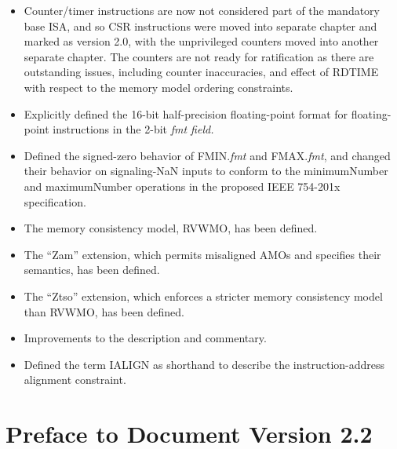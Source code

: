 \begin{itemize}
\item Counter/timer instructions are now not considered part of the
  mandatory base ISA, and so CSR instructions were moved into separate
  chapter and marked as version 2.0, with the unprivileged counters
  moved into another separate chapter.  The counters are not ready for
  ratification as there are outstanding issues, including counter
  inaccuracies, and effect of RDTIME with respect to the memory model
  ordering constraints.
\item Explicitly defined the 16-bit half-precision floating-point
  format for floating-point instructions in the 2-bit {\em fmt field.}
\item Defined the signed-zero behavior of FMIN.{\em fmt} and FMAX.{\em fmt},
  and changed their behavior on signaling-NaN inputs to conform to the
  minimumNumber and maximumNumber operations in the proposed IEEE 754-201x
  specification.
\item The memory consistency model, RVWMO, has been defined.
\item The ``Zam'' extension, which permits misaligned AMOs and specifies their semantics, has been defined.
\item The ``Ztso'' extension, which enforces a stricter memory consistency model than RVWMO, has been defined.
\item Improvements to the description and commentary.
\item Defined the term IALIGN as shorthand to describe the instruction-address
  alignment constraint.
\end{itemize}

\section*{Preface to Document Version 2.2}


